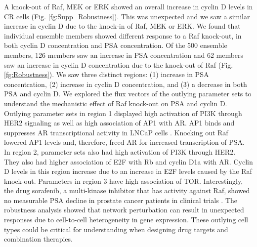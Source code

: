 \documentclass[12pt]{article}
\begin{document}
A knock-out of Raf, MEK or ERK showed an overall increase in cyclin D levels in CR cells (Fig. \ref{fg:Supp_Robustness}). 
This was unexpected and we saw a similar increase in cyclin D due to the knock-in of Raf, MEK or ERK. 
We found that individual ensemble members showed different response to a Raf knock-out, in both cyclin D concentration and PSA concentration. 
Of the 500 ensemble members, 126 members saw an increase in PSA concentration and 62 members saw an increase in cyclin D concentration due to the knock-out of Raf (Fig. \ref{fg:Robustness}). 
We saw three distinct regions: (1) increase in PSA concentration, (2) increase in cyclin D concentration, and (3) a decrease in both PSA and cyclin D. 
We explored the flux vectors of the outlying parameter sets to understand the mechanistic effect of Raf knock-out on PSA and cyclin D. 
Outlying parameter sets in region 1 displayed high activation of PI3K through HER2 signaling as well as high association of AP1 with AR. 
AP1 binds and suppresses AR transcriptional activity in LNCaP cells \cite{Sato1997}. 
Knocking out Raf lowered AP1 levels and, therefore, freed AR for increased transcription of PSA.
In region 2, parameter sets also had high activation of PI3K through HER2. 
They also had higher association of E2F with Rb and cyclin D1a with AR. 
Cyclin D levels in this region increase due to an increase in E2F levels caused by the Raf knock-out. 
Parameters in region 3 have high association of TOR. 
Interestingly, the drug sorafenib, a multi-kinase inhibitor that has activity against Raf, showed no measurable PSA decline in prostate cancer patients in clinical trials \cite{Dahut2008}. 
The robustness analysis showed that network perturbation can result in unexpected responses due to cell-to-cell heterogeneity in gene expression. 
These outlying cell types could be critical for understanding when designing drug targets and combination therapies.
 
\end{document}

